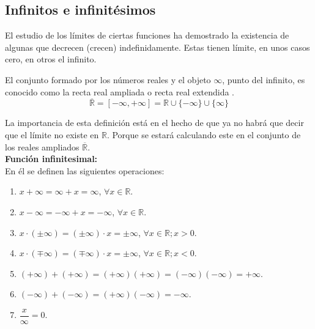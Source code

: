 \documentclass[10pt,twoside]{SelfArx} %
\begin{document}




\subsection{Infinitos e infinit\'esimos}
El estudio de los límites de ciertas funciones ha demostrado la existencia de algunas que decrecen (crecen) indefinidamente. Estas tienen límite, en unos casos cero, en otros el infinito.\\
\begin{thm}
	El conjunto formado por los números reales y el objeto $ \infty $, punto del infinito, es conocido como la recta real ampliada o recta real extendida .
\[ \overline{\mathbb{R}}=[-\infty,+\infty]=\mathbb{R}\cup\{-\infty\}\cup\{\infty\} \]
\end{thm}	
La importancia de esta definición está en el hecho de que ya no habrá que decir que el límite no existe en $ \mathbb{R} $. Porque se estará calculando este en el conjunto de los reales ampliados $ \overline{\mathbb{R}} $.\\
\textbf{Función infinitesimal:}\\
En él se definen las siguientes operaciones:\\
\begin{enumerate}\label{operaciones_infty}
	\item $ x+\infty=\infty+x=\infty $, $ \forall x\in\mathbb{R} $.
	\item $ x-\infty=-\infty+x=-\infty $, $ \forall x\in\mathbb{R} $.
	\item $ x\cdot(\pm\infty)=(\pm\infty)\cdot x=\pm\infty $, $ \forall x\in\mathbb{R}; x>0 $.
	\item $ x\cdot(\mp\infty)=(\mp\infty)\cdot x=\pm\infty $, $ \forall x\in\mathbb{R}; x<0 $.
	\item $ (+\infty)+(+\infty)=(+\infty)(+\infty)=(-\infty)(-\infty)=+\infty $.
	\item $ (-\infty)+(-\infty)=(+\infty)(-\infty)=-\infty $.
	\item $ \dfrac{x}{\infty}=0 $.
\end{enumerate}
\end{document}
